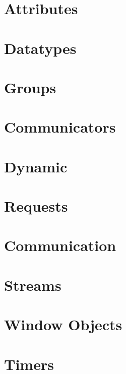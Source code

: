 \documentclass{article}
\begin{document}
\section{Attributes}





\section{Datatypes}




\section{Groups}



\section{Communicators}


\section{Dynamic}


\section{Requests}


\section{Communication}



\section{Streams}



\section{Window Objects}


\section{Timers}

\end{document}
